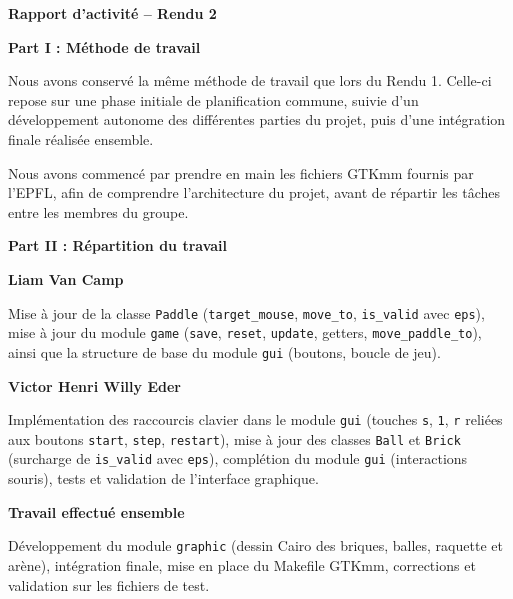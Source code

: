 \documentclass[10pt,a4paper]{article}
\begin{document}
\begin{center}
    {\huge \textbf{Rapport d’activité -- Rendu 2}}
\end{center}
\vspace{0.5cm}

{\large \textbf{Part I : Méthode de travail}}

\begin{list}{}{\leftmargin=0.5cm \rightmargin=0cm}
\item
Nous avons conservé la même méthode de travail que lors du Rendu 1. Celle-ci repose sur une phase initiale de planification commune, suivie d’un développement autonome des différentes parties du projet, puis d’une intégration finale réalisée ensemble.

Nous avons commencé par prendre en main les fichiers GTKmm fournis par l’EPFL, afin de comprendre l’architecture du projet, avant de répartir les tâches entre les membres du groupe.
\end{list}

{\large \textbf{Part II : Répartition du travail}}

\begin{list}{}{\leftmargin=0.5cm \rightmargin=0cm}
\item
    {\normalsize \textbf{Liam Van Camp}}

    \begin{list}{}{\leftmargin=0.5cm \rightmargin=0cm}
    \item
    Mise à jour de la classe \texttt{Paddle} (\texttt{target\_mouse}, \texttt{move\_to}, \texttt{is\_valid} avec \texttt{eps}), mise à jour du module \texttt{game} (\texttt{save}, \texttt{reset}, \texttt{update}, getters, \texttt{move\_paddle\_to}), ainsi que la structure de base du module \texttt{gui} (boutons, boucle de jeu).
    \end{list}

    {\normalsize \textbf{Victor Henri Willy Eder}}

    \begin{list}{}{\leftmargin=0.5cm \rightmargin=0cm}
    \item
    Implémentation des raccourcis clavier dans le module \texttt{gui} (touches \texttt{s}, \texttt{1}, \texttt{r} reliées aux boutons \texttt{start}, \texttt{step}, \texttt{restart}), mise à jour des classes \texttt{Ball} et \texttt{Brick} (surcharge de \texttt{is\_valid} avec \texttt{eps}), complétion du module \texttt{gui} (interactions souris), tests et validation de l’interface graphique.
    \end{list}

    {\normalsize \textbf{Travail effectué ensemble}}

    \begin{list}{}{\leftmargin=0.5cm \rightmargin=0cm}
    \item
    Développement du module \texttt{graphic} (dessin Cairo des briques, balles, raquette et arène), intégration finale, mise en place du Makefile GTKmm, corrections et validation sur les fichiers de test.
    \end{list}
\end{list}
\end{document}
